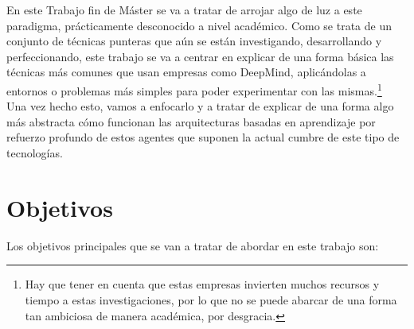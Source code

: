 \documentclass[11pt,fleqn]{book} %
\begin{document}
En este Trabajo fin de Máster se va a tratar de arrojar algo de luz a este paradigma, prácticamente desconocido a nivel académico. Como se trata de un conjunto de técnicas punteras que aún se están investigando, desarrollando y perfeccionando, este trabajo se va a centrar en explicar de una forma básica las técnicas más comunes que usan empresas como DeepMind, aplicándolas a entornos o problemas más simples para poder experimentar con las mismas.\footnote{Hay que tener en cuenta que estas empresas invierten muchos recursos y tiempo a estas investigaciones, por lo que no se puede abarcar de una forma tan ambiciosa de manera académica, por desgracia.} \\

Una vez hecho esto, vamos a enfocarlo y a tratar de explicar de una forma algo más abstracta cómo funcionan las arquitecturas basadas en aprendizaje por refuerzo profundo de estos agentes que suponen la actual cumbre de este tipo de tecnologías. \\

\section{Objetivos}\label{sec:objetivos}

Los objetivos principales que se van a tratar de abordar en este trabajo son: \\
\end{document}
